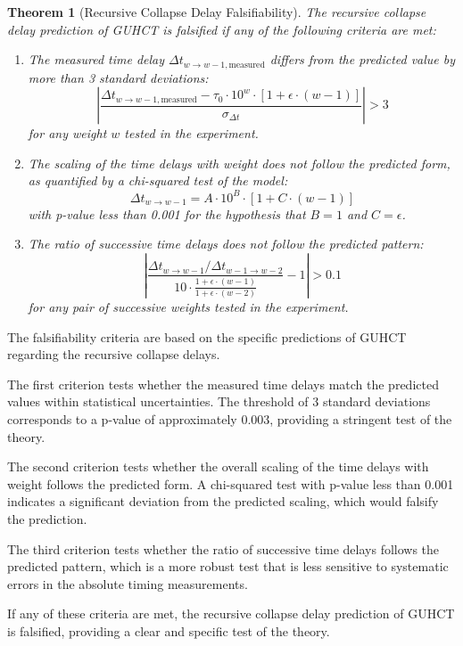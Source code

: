 \documentclass[11pt,a4paper]{article}
\makeatletter
\newtheorem{theorem}{Theorem}[section]
\renewenvironment{proof}[1][\proofname]{\par
  \pushQED{\qed}%
  \normalfont \topsep6\p@\@plus6\p@\relax
  \trivlist
  \item[\hskip\labelsep
        \itshape
    #1\@addpunct{.}]\ignorespaces
}{%
  \popQED\endtrivlist\@endpefalse
}
\makeatother
\begin{document}
\begin{theorem}[Recursive Collapse Delay Falsifiability]
\label{thm:delay_falsifiability}
The recursive collapse delay prediction of GUHCT is falsified if any of the following criteria are met:
\begin{enumerate}
    \item The measured time delay $\Delta t_{w \to w-1,\text{measured}}$ differs from the predicted value by more than 3 standard deviations:
    \begin{equation}
    \left|\frac{\Delta t_{w \to w-1,\text{measured}} - \tau_0 \cdot 10^w \cdot [1 + \epsilon \cdot (w-1)]}{\sigma_{\Delta t}}\right| > 3
    \end{equation}
    for any weight $w$ tested in the experiment.
    
    \item The scaling of the time delays with weight does not follow the predicted form, as quantified by a chi-squared test of the model:
    \begin{equation}
    \Delta t_{w \to w-1} = A \cdot 10^B \cdot [1 + C \cdot (w-1)]
    \end{equation}
    with p-value less than 0.001 for the hypothesis that $B = 1$ and $C = \epsilon$.
    
    \item The ratio of successive time delays does not follow the predicted pattern:
    \begin{equation}
    \left|\frac{\Delta t_{w \to w-1} / \Delta t_{w-1 \to w-2}}{10 \cdot \frac{1 + \epsilon \cdot (w-1)}{1 + \epsilon \cdot (w-2)}} - 1\right| > 0.1
    \end{equation}
    for any pair of successive weights tested in the experiment.
\end{enumerate}
\end{theorem}

\begin{proof}
The falsifiability criteria are based on the specific predictions of GUHCT regarding the recursive collapse delays.

The first criterion tests whether the measured time delays match the predicted values within statistical uncertainties. The threshold of 3 standard deviations corresponds to a p-value of approximately 0.003, providing a stringent test of the theory.

The second criterion tests whether the overall scaling of the time delays with weight follows the predicted form. A chi-squared test with p-value less than 0.001 indicates a significant deviation from the predicted scaling, which would falsify the prediction.

The third criterion tests whether the ratio of successive time delays follows the predicted pattern, which is a more robust test that is less sensitive to systematic errors in the absolute timing measurements.

If any of these criteria are met, the recursive collapse delay prediction of GUHCT is falsified, providing a clear and specific test of the theory.
\end{proof}
\end{document}
